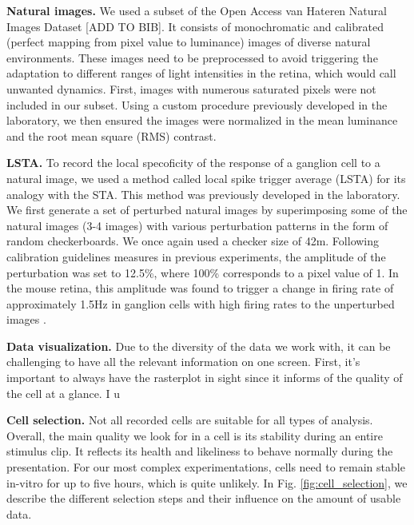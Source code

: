 \textbf{Natural images.}
We used a subset of the Open Access van Hateren Natural Images Dataset [ADD TO
        BIB]. It consists of monochromatic and calibrated (perfect mapping from
pixel
value to luminance) images of diverse natural environments. These images need
to
be preprocessed to avoid triggering the adaptation to different ranges of light
intensities in the retina, which would call unwanted
dynamics. First, images with numerous saturated pixels were not included in our
subset. Using a custom procedure previously developed in the laboratory, we
then
ensured the images were normalized in the mean luminance and the root mean
square (RMS) contrast.

\textbf{LSTA.}
To record the local specoficity of the response of a ganglion cell to a natural
image, we used a method called local spike trigger average (LSTA) for its
analogy with the STA. This method was previously developed in the laboratory.
We first generate a set of perturbed natural images by superimposing some of
the natural images (3-4 images) with various perturbation patterns in the form
of random checkerboards. We once again used a checker size of 42\textmu m.
Following calibration guidelines measures in previous experiments, the
amplitude of the perturbation was set to 12.5\%, where 100\% corresponds to a
pixel value of 1. In the mouse retina, this amplitude was found to trigger a
change in firing rate of approximately 1.5Hz in ganglion cells with high firing
rates to the unperturbed images \citep{goldin_context-dependent_2022}.

\textbf{Data visualization.}
Due to the diversity of the data we work with, it can be challenging to have
all the relevant information on one screen. First, it's important to always
have the rasterplot in sight since it informs of the quality of the cell at a
glance. I u

\textbf{Cell selection.}
Not all recorded cells are suitable for all types of analysis. Overall, the
main
quality we look for in a cell is its stability during an entire stimulus clip.
It reflects its health and likeliness to behave normally during the
presentation. For our most complex experimentations, cells need to remain
stable in-vitro for up to five hours, which is quite unlikely. In Fig. \ref{fig:cell_selection}, we
describe the different selection steps and their influence on the amount of
usable data.

